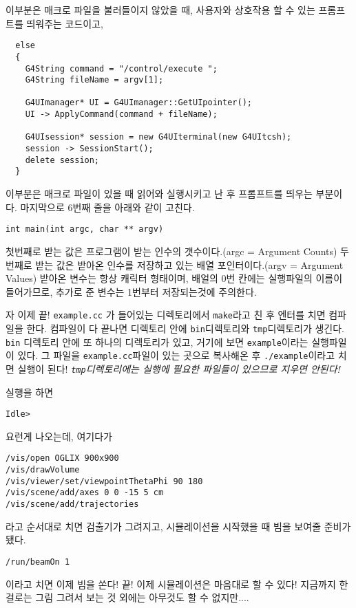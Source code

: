 이부분은 매크로 파일을 불러들이지 않았을 때, 사용자와 상호작용 할 수 있는
프롬프트를 띄워주는 코드이고, 
\begin{pc}
\begin{lstlisting}
  else
  {
    G4String command = "/control/execute ";
    G4String fileName = argv[1];

    G4UImanager* UI = G4UImanager::GetUIpointer();
    UI -> ApplyCommand(command + fileName);
    
    G4UIsession* session = new G4UIterminal(new G4UItcsh);
    session -> SessionStart();
    delete session;
  }
\end{lstlisting}
\end{pc}
이부분은 매크로 파일이 있을 때 읽어와 실행시키고 난 후 프롬프트를 띄우는
부분이다. 마지막으로 6번째 줄을 아래와 같이 고친다.
\begin{pc}
\begin{lstlisting}
int main(int argc, char ** argv)
\end{lstlisting}
\end{pc}
첫번째로 받는 값은 프로그램이 받는 인수의 갯수이다.(argc = Argument Counts)
두번째로 받는 값은 받아온 인수를 저장하고 있는 배열 포인터이다.(argv =
Argument Values) 받아온 변수는 항상 캐릭터 형태이며, 배얼의 0번 칸에는
실행파일의 이름이 들어가므로, 추가로 준 변수는 1번부터 저장되는것에 주의한다.

자 이제 끝! \texttt{example.cc} 가 들어있는 디렉토리에서 \texttt{make}라고
친 후 엔터를 치면 컴파일을 한다. 컴파일이 다 끝나면 디렉토리 안에
\texttt{bin}디렉토리와 \texttt{tmp}디렉토리가 생긴다. \texttt{bin} 디렉토리
안에 또 하나의 디렉토리가 있고, 거기에 보면 \texttt{example}이라는 실행파일이
있다. 그 파일을 \texttt{example.cc}파일이 있는 곳으로 복사해온 후
\texttt{./example}이라고 치면 실행이 된다! \emph{\texttt{tmp}디렉토리에는
실행에 필요한 파일들이 있으므로 지우면 안된다!}

실행을 하면
\begin{pc}
\begin{lstlisting}
Idle> 
\end{lstlisting}
\end{pc}
요런게 나오는데, 여기다가
\begin{pc}
\begin{lstlisting}
/vis/open OGLIX 900x900
/vis/drawVolume
/vis/viewer/set/viewpointThetaPhi 90 180
/vis/scene/add/axes 0 0 -15 5 cm
/vis/scene/add/trajectories
\end{lstlisting}
\end{pc}
라고 순서대로 치면 검출기가 그려지고, 시뮬레이션을 시작했을 때 빔을 보여줄
준비가 됐다.
\begin{pc}
\begin{lstlisting}
/run/beamOn 1
\end{lstlisting}
\end{pc}
이라고 치면 이제 빔을 쏜다! 끝! 이제 시뮬레이션은 마음대로 할 수 있다!
지금까지 한걸로는 그림 그려서 보는 것 외에는 아무것도 할 수 없지만....

